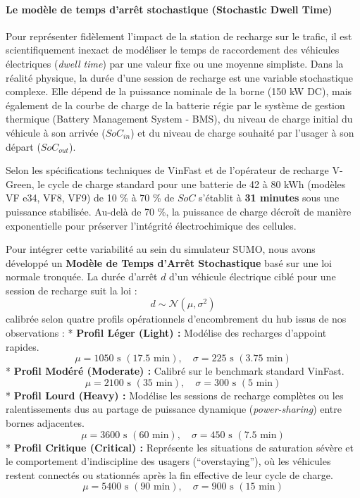 \documentclass[10pt, a4paper]{article}
\begin{document}
\paragraph{Le modèle de temps d'arrêt stochastique (Stochastic Dwell
Time)}\label{le-moduxe8le-de-temps-darruxeat-stochastique-stochastic-dwell-time}

Pour représenter fidèlement l'impact de la station de recharge sur le
trafic, il est scientifiquement inexact de modéliser le temps de
raccordement des véhicules électriques (\emph{dwell time}) par une
valeur fixe ou une moyenne simpliste. Dans la réalité physique, la durée
d'une session de recharge est une variable stochastique complexe. Elle
dépend de la puissance nominale de la borne (150 kW DC), mais également
de la courbe de charge de la batterie régie par le système de gestion
thermique (Battery Management System - BMS), du niveau de charge initial
du véhicule à son arrivée (\(SoC_{in}\)) et du niveau de charge souhaité
par l'usager à son départ (\(SoC_{out}\)).

Selon les spécifications techniques de VinFast et de l'opérateur de
recharge V-Green, le cycle de charge standard pour une batterie de 42 à
80 kWh (modèles VF e34, VF8, VF9) de 10 \% à 70 \% de \(SoC\) s'établit
à \textbf{31 minutes} sous une puissance stabilisée. Au-delà de 70 \%,
la puissance de charge décroît de manière exponentielle pour préserver
l'intégrité électrochimique des cellules.

Pour intégrer cette variabilité au sein du simulateur SUMO, nous avons
développé un \textbf{Modèle de Temps d'Arrêt Stochastique} basé sur une
loi normale tronquée. La durée d'arrêt \(d\) d'un véhicule électrique
ciblé pour une session de recharge suit la loi :
\[d \sim \mathcal{N}(\mu, \sigma^2)\] calibrée selon quatre profils
opérationnels d'encombrement du hub issus de nos observations : *
\textbf{Profil Léger (Light) :} Modélise des recharges d'appoint
rapides.
\[\mu = 1050 \text{ s } (17.5 \text{ min}), \quad \sigma = 225 \text{ s } (3.75 \text{ min})\]
* \textbf{Profil Modéré (Moderate) :} Calibré sur le benchmark standard
VinFast.
\[\mu = 2100 \text{ s } (35 \text{ min}), \quad \sigma = 300 \text{ s } (5 \text{ min})\]
* \textbf{Profil Lourd (Heavy) :} Modélise les sessions de recharge
complètes ou les ralentissements dus au partage de puissance dynamique
(\emph{power-sharing}) entre bornes adjacentes.
\[\mu = 3600 \text{ s } (60 \text{ min}), \quad \sigma = 450 \text{ s } (7.5 \text{ min})\]
* \textbf{Profil Critique (Critical) :} Représente les situations de
saturation sévère et le comportement d'indiscipline des usagers
(``overstaying''), où les véhicules restent connectés ou stationnés
après la fin effective de leur cycle de charge.
\[\mu = 5400 \text{ s } (90 \text{ min}), \quad \sigma = 900 \text{ s } (15 \text{ min})\]
\end{document}
